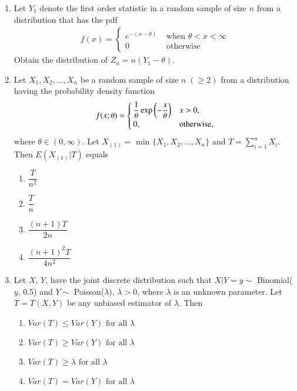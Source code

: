 \renewcommand{\theequation}{\theenumi}
\renewcommand{\thefigure}{\theenumi}
\renewcommand{\thetable}{\theenumi}
\begin{enumerate}[label=\thesection.\arabic*.,ref=\thesection.\theenumi]



\item Let $Y_1$ denote the first order statistic in a random sample of size $n$ from a distribution that has the pdf 
\begin{align}
    f(x) = 
    \begin{cases}
    e^{-(x-\theta)}&\text{ when } \theta<x<\infty\\
    0 &\text{  otherwise} 
    \end{cases}
\end{align}
Obtain the distribution of $Z_n = n(Y_1 - \theta)$.
%
\\
\solution

%
\item Let $X_1, X_2, \ldots , X_n$ be a random sample of size $n \; ( \geq 2 ) $ from a distribution having the probability density function
\begin{align}
f(x;\theta) = 
\begin{cases}
\dfrac{1}{\theta} \exp\left(-\dfrac{x}{\theta}\right) & x > 0, \\
0, & \text{otherwise,}
\end{cases}
\end{align}
where $\theta \in (0, \infty)$. Let $X_{(1)} = $ min $ \{ X_1, X_2, \ldots , X_n \} $ and $T = \sum_{i=1}^n X_i $. Then $E(X_{(1)} | T)$ equals 
\begin{enumerate}[label = (\Alph*)]
\item $\dfrac{T}{n^2}$ \\
\item $\dfrac{T}{n}$ \\
\item $\dfrac{(n+1)T}{2n}$ \\
\item $\dfrac{(n+1)^2 T}{4n^2}$
\end{enumerate}
\solution

%
\item Let $X$, $Y$, have the joint discrete distribution such that $X|Y=y \sim$ Binomial($y$, 0.5) and $Y\sim$ Poisson($\lambda$), $\lambda>0$, where $\lambda$ is an unknown parameter. Let $T=T(X, Y)$ be any unbiased estimator of $\lambda$. Then
\begin{enumerate}
    \item  $Var(T) \leq Var(Y)  \text{ for all } \lambda$
    \item $Var(T) \geq Var(Y) \text{ for all } \lambda$
    \item $Var(T) \geq \lambda \text{ for all } \lambda$
    \item $Var(T) = Var(Y) \text{ for all } \lambda$
\end{enumerate}
\solution




\end{enumerate}
